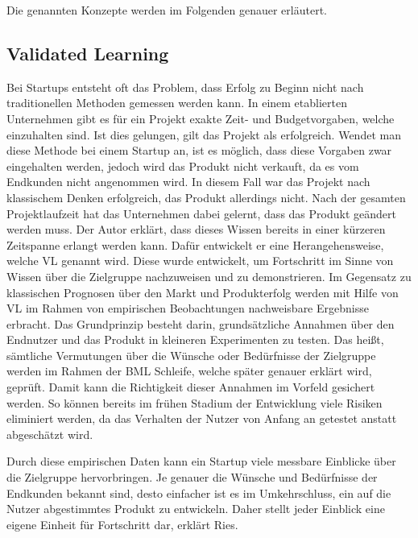 Die genannten Konzepte werden im Folgenden genauer erläutert.

\subsection*{Validated Learning}
Bei Startups entsteht oft das Problem, dass Erfolg zu Beginn nicht nach traditionellen Methoden gemessen werden kann. In einem etablierten Unternehmen gibt es für ein Projekt exakte Zeit- und Budgetvorgaben, welche einzuhalten sind. Ist dies gelungen, gilt das Projekt als erfolgreich. Wendet man diese Methode bei einem Startup an, ist es möglich, dass diese Vorgaben zwar eingehalten werden, jedoch wird das Produkt nicht verkauft, da es vom Endkunden nicht angenommen wird. In diesem Fall war das Projekt nach klassischem Denken erfolgreich, das Produkt allerdings nicht. Nach der gesamten Projektlaufzeit hat das Unternehmen dabei gelernt, dass das Produkt geändert werden muss. Der Autor erklärt, dass dieses Wissen bereits in einer kürzeren Zeitspanne erlangt werden kann. Dafür entwickelt er eine Herangehensweise, welche \ac{VL} genannt wird. Diese wurde entwickelt, um Fortschritt im Sinne von Wissen über die Zielgruppe nachzuweisen und zu demonstrieren. Im Gegensatz zu klassischen Prognosen über den Markt und Produkterfolg werden mit Hilfe von \ac{VL} im Rahmen von empirischen Beobachtungen nachweisbare Ergebnisse erbracht. Das Grundprinzip besteht darin, grundsätzliche Annahmen über den Endnutzer und das Produkt in kleineren Experimenten zu testen. Das heißt, sämtliche Vermutungen über die Wünsche oder Bedürfnisse der Zielgruppe werden im Rahmen der \ac{BML} Schleife, welche später genauer erklärt wird, geprüft. Damit kann die Richtigkeit dieser Annahmen im Vorfeld gesichert werden. So können bereits im frühen Stadium der Entwicklung viele Risiken eliminiert werden, da das Verhalten der Nutzer von Anfang an getestet anstatt abgeschätzt wird.

Durch diese empirischen Daten kann ein Startup viele messbare Einblicke über die Zielgruppe hervorbringen. Je genauer die Wünsche und Bedürfnisse der Endkunden bekannt sind, desto einfacher ist es im Umkehrschluss, ein auf die Nutzer abgestimmtes Produkt zu entwickeln. Daher stellt jeder Einblick eine eigene Einheit für Fortschritt dar, erklärt Ries.


